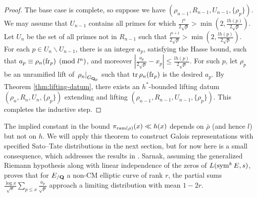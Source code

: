 \begin{proof}
The base case is complete, so suppose we have 
$(\rho_{n-1},R_{n-1},U_{n-1},\{\rho_p\})$. We may assume that $U_{n-1}$ 
contains all primes for 
which $\frac{l^n}{2\sqrt p} > \min\left(2, \frac{l h(p)}{2\sqrt p}\right)$. Let 
$U_n$ be the set of all primes not in $R_{n-1}$ such that 
$\frac{l^{n+1}}{2\sqrt p} > \min\left(2, \frac{l h(p)}{2\sqrt p}\right)$. For 
each $p\in U_n\smallsetminus U_{n-1}$, there is an integer $a_p$, satisfying 
the Hasse bound, such that $a_p\equiv \rho_n(\mathrm{fr}_p)\pmod{l^n}$, and moreover 
$\left|\frac{a_p}{2\sqrt p} - x_p\right| \leqslant \frac{l h(p)}{2\sqrt p}$. 
For such $p$, let $\rho_p$ be an unramified lift of 
$\left. \rho_n\right|_{G_{\mathbf{Q}_p}}$ such that $\operatorname{tr}\rho_n(\mathrm{fr}_p)$ is the 
desired $a_p$. By Theorem \ref{thm:lifting-datum}, there exists an 
$h^\ast$-bounded lifting datum $(\rho_n,R_n,U_n,\{\rho_p\})$ extending and 
lifting $(\rho_{n-1},R_{n-1},U_{n-1},\{\rho_p\})$. This completes the inductive 
step.  
\end{proof}

The implied constant in the bound $\pi_{\mathrm{ram}(\rho)}(x)\ll h(x)$ depends on 
$\bar\rho$ (and hence $l$) but not on $h$. 
We will apply this theorem to construct Galois representations with specified 
Sato--Tate distributions in the next section, but for now here is a small 
consequence, which addresses the results in \cite{sarnak-2007}. Sarnak, assuming 
the generalized Riemann hypothesis along with linear independence of the 
zeros of $L(\operatorname{sym}^k E,s)$, proves 
that for $E_{/\mathbf{Q}}$ a non-CM elliptic curve of rank $r$, the partial sums 
$\frac{\log x}{\sqrt x} \sum_{p\leqslant x} \frac{a_p}{\sqrt p}$ approach a 
limiting distribution with mean $1 - 2 r$. 

